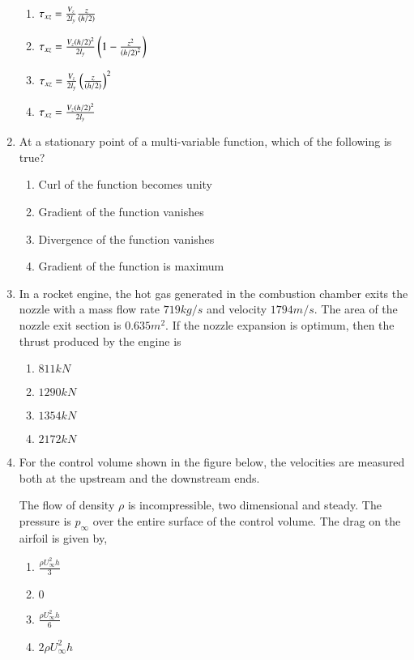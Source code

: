 \documentclass[journal]{IEEEtran}
\begin{document}
\begin{enumerate}
		\begin{enumerate}
			\item $\tau_{xz} = \frac{V_z}{2l_y}\frac{z}{\left(h/2\right)}$
			\item $\tau_{xz} = \frac{V_z\left(h/2\right)^2}{2l_y}\left(1-\frac{z^2}{\left(h/2\right)^2}\right)$
			\item $\tau_{xz} = \frac{V_z}{2l_y}\left(\frac{z}{\left(h/2\right)}\right)^2$
			\item $\tau_{xz} = \frac{V_z\left(h/2\right)^2}{2l_y}$
		\end{enumerate}
	\item At a stationary point of a multi-variable function, which of the following is true?
		\begin{enumerate}
			\item Curl of the function becomes unity
			\item Gradient of the function vanishes
			\item Divergence of the function vanishes
			\item Gradient of the function is maximum
		\end{enumerate}
	\item In a rocket engine, the hot gas generated in the combustion chamber exits the nozzle with a mass flow rate $719 kg/s$ and velocity $1794 m/s$. The area of the nozzle exit section is $0.635 m^2$. If the nozzle expansion is optimum, then the thrust produced by the engine is 
		\begin{enumerate}
			\item $811 kN$
			\item $1290 kN$
			\item $1354 kN$
			\item $2172 kN$
		\end{enumerate}
	\item For the control volume shown in the figure below, the velocities are measured both at the upstream and the downstream ends.
		\begin{figure}
			
		\end{figure}
		The flow of density $\rho$ is incompressible, two dimensional and steady. The pressure is $p_{\infty}$ over the entire surface of the control volume. The drag on the airfoil is given by,
		\begin{enumerate}
			\item $\frac{\rho U^2_{\infty}h}{3}$
			\item $0$
			\item $\frac{\rho U^2_{\infty}h}{6}$
			\item $2\rho U^2_{\infty}h$

\end{enumerate}
\end{enumerate}
\end{document}
